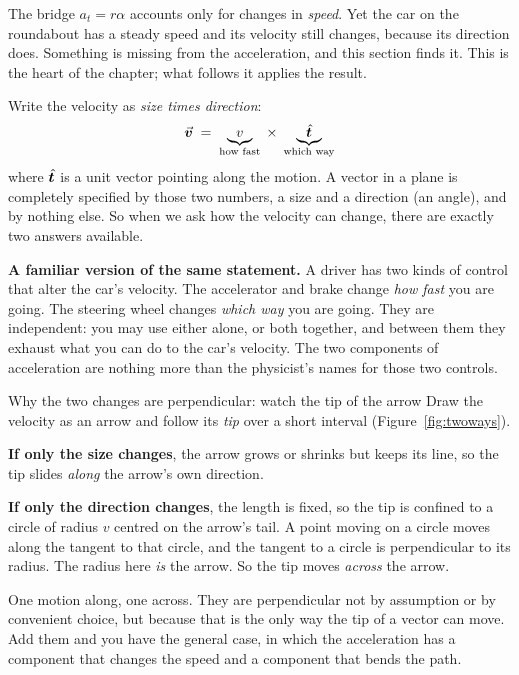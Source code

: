 The bridge $a_t=r\alpha$ accounts only for changes in \emph{speed}. Yet the car on the roundabout
has a steady speed and its velocity still changes, because its direction does. Something is missing
from the acceleration, and this section finds it. This is the heart of the chapter; what follows it
applies the result.

Write the velocity as \emph{size times direction}:
\[
\vec{\bm{v}} \;=\; \underbrace{v}_{\text{how fast}}\;\times\;\underbrace{\hat{\bm{t}}}_{\text{which way}}
\]
where $\hat{\bm{t}}$ is a unit vector pointing along the motion. A vector in a plane is completely
specified by those two numbers, a size and a direction (an angle), and by nothing else. So when we ask
how the velocity can change, there are exactly two answers available.

\smallskip
\textbf{A familiar version of the same statement.} A driver has two kinds of control that alter the
car's velocity. The accelerator and brake change \emph{how fast} you are going. The steering
wheel changes \emph{which way} you are going. They are independent: you may use either alone, or both
together, and between them they exhaust what you can do to the car's velocity. The two components of
acceleration are nothing more than the physicist's names for those two controls.


\begin{motivbox}{Why the two changes are perpendicular: watch the tip of the arrow}
Draw the velocity as an arrow and follow its \emph{tip} over a short interval (Figure~\ref{fig:twoways}).

\smallskip
\textbf{If only the size changes}, the arrow grows or shrinks but keeps its line, so the tip slides
\emph{along} the arrow's own direction.

\smallskip
\textbf{If only the direction changes}, the length is fixed, so the tip is confined to a circle of
radius $v$ centred on the arrow's tail. A point moving on a circle moves along the tangent to that
circle, and the tangent to a circle is perpendicular to its radius. The radius here \emph{is} the
arrow. So the tip moves \emph{across} the arrow.

\smallskip
One motion along, one across. They are perpendicular not by assumption or by convenient choice, but
because that is the only way the tip of a vector can move. Add them and you have the general case, in
which the acceleration has a component that changes the speed and a component that bends the path.
\end{motivbox}

